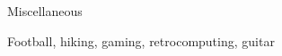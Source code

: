 
\begin{rubric}{Miscellaneous}

\entry*[Hobbies:]
  Football, hiking,  gaming, retrocomputing, guitar

\end{rubric}

